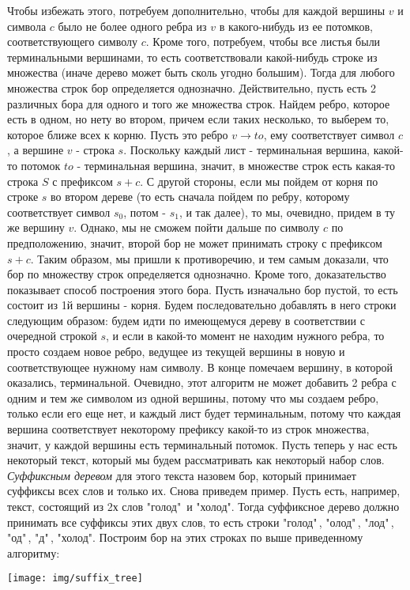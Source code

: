 Чтобы избежать этого, потребуем дополнительно, чтобы для каждой вершины $v$ и символа $c$ было не более одного ребра из $v$ в какого-нибудь из ее потомков, соответствующего символу $c$. Кроме того, потребуем, чтобы все листья были терминальными вершинами, то есть соответствовали какой-нибудь строке из множества (иначе дерево может быть сколь угодно большим). Тогда для любого множества строк бор определяется однозначно. Действительно, пусть есть 2 различных бора для одного и того же множества строк. Найдем ребро, которое есть в одном, но нету во втором, причем если таких несколько, то выберем то, которое ближе всех к корню. Пусть это ребро $v \rightarrow to$, ему соответствует символ $c$, а вершине $v$ - строка $s$. Поскольку каждый лист - терминальная вершина, какой-то потомок $to$ - терминальная вершина, значит, в множестве строк есть какая-то строка $S$ с префиксом $s + c$. С другой стороны, если мы пойдем от корня по строке $s$ во втором дереве (то есть сначала пойдем по ребру, которому соответствует символ $s_0$, потом - $s_1$, и так далее), то мы, очевидно, придем в ту же вершину $v$. Однако, мы не сможем пойти дальше по символу $c$ по предположению, значит, второй бор не может принимать строку с префиксом $s + c$. Таким образом, мы пришли к противоречию, и тем самым доказали, что бор по множеству строк определяется однозначно. Кроме того, доказательство показывает способ построения этого бора. Пусть изначально бор пустой, то есть состоит из 1й вершины - корня. Будем последовательно добавлять в него строки следующим образом: будем идти по имеющемуся дереву в соответствии с очередной строкой $s$, и если в какой-то момент не находим нужного ребра, то просто создаем новое ребро, ведущее из текущей вершины в новую и соответствующее нужному нам символу. В конце помечаем вершину, в которой оказались, терминальной. Очевидно, этот алгоритм не может добавить 2 ребра с одним и тем же символом из одной вершины, потому что мы создаем ребро, только если его еще нет, и каждый лист будет терминальным, потому что каждая вершина соответствует некоторому префиксу какой-то из строк множества, значит, у каждой вершины есть терминальный потомок. \newline
Пусть теперь у нас есть некоторый текст, который мы будем рассматривать как некоторый набор слов. \emph{Суффиксным деревом} для этого текста назовем бор, который принимает суффиксы всех слов и только их. \newline
Снова приведем пример. Пусть есть, например, текст, состоящий из 2х слов "голод"\ и "холод". Тогда суффиксное дерево должно принимать все суффиксы этих двух слов, то есть строки "голод"\,, "олод"\,, "лод"\,, "од"\,, "д"\,, "холод". Построим бор на этих строках по выше приведенному алгоритму:
\begin{center} 
	\texttt{[image: img/suffix\_tree]}
\end{center}

